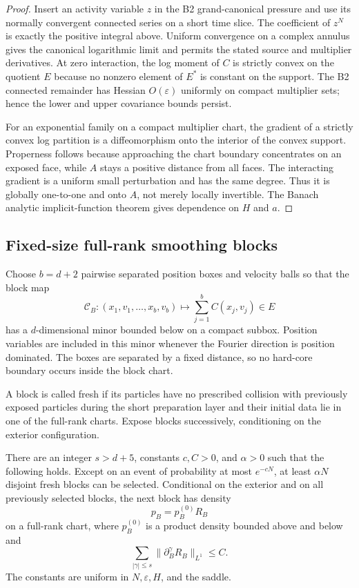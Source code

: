 \begin{proof}
Insert an activity variable $z$ in the B2 grand-canonical pressure and use its
normally convergent connected series on a short time slice.  The coefficient
of $z^N$ is exactly the positive integral above.  Uniform convergence on a
complex annulus gives the canonical logarithmic limit and permits the stated
source and multiplier derivatives.  At zero interaction, the log moment of
$C$ is strictly convex on the quotient $E$ because no nonzero element of
$E^*$ is constant on the support.  The B2 connected remainder has Hessian
$O(\varepsilon)$ uniformly on compact multiplier sets; hence the lower and
upper covariance bounds persist.

For an exponential family on a compact multiplier chart, the gradient of a
strictly convex log partition is a diffeomorphism onto the interior of the
convex support.  Properness follows because approaching the chart boundary
concentrates on an exposed face, while $A$ stays a positive distance from all
faces.  The interacting gradient is a uniform small perturbation and has the
same degree.  Thus it is globally one-to-one and onto $A$, not merely locally
invertible.  The Banach analytic implicit-function theorem gives dependence
on $H$ and $a$.
\end{proof}

\subsection{Fixed-size full-rank smoothing blocks}

Choose $b=d+2$ pairwise separated position boxes and velocity balls so that
the block map
\[
 \mathcal C_B:(x_1,v_1,\ldots,x_b,v_b)\longmapsto
 \sum_{j=1}^b C(x_j,v_j)\in E
\]
has a $d$-dimensional minor bounded below on a compact subbox.  Position
variables are included in this minor whenever the Fourier direction is
position dominated.  The boxes are separated by a fixed distance, so no
hard-core boundary occurs inside the block chart.

A block is called fresh if its particles have no prescribed collision with
previously exposed particles during the short preparation layer and their
initial data lie in one of the full-rank charts.  Expose blocks successively,
conditioning on the exterior configuration.

\begin{lemma}
\label{lem:r21-b1-block}
There are an integer $s>d+5$, constants $c,C>0$, and $\alpha>0$ such that the
following holds.  Except on an event of probability at most $e^{-cN}$, at
least $\alpha N$ disjoint fresh blocks can be selected.  Conditional on the
exterior and on all previously selected blocks, the next block has density
\[
 p_B=p_B^{(0)}R_B
\]
on a full-rank chart, where $p_B^{(0)}$ is a product density bounded above and
below and
\[
 \sum_{|\gamma|\le s}\|\partial_B^\gamma R_B\|_{L^1}\le C.
\]
The constants are uniform in $N,\varepsilon,H$, and the saddle.
\end{lemma}

